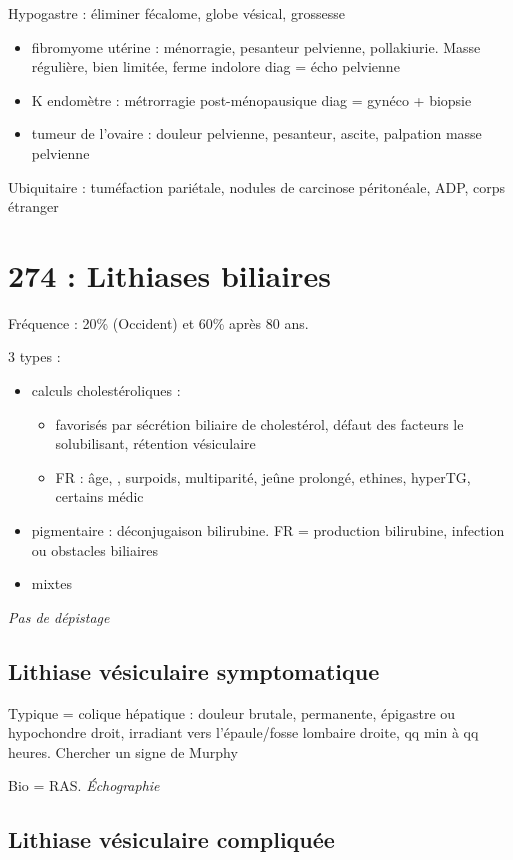 \documentclass[11pt]{article}
\begin{document}
Hypogastre : éliminer fécalome, globe vésical, grossesse
\begin{itemize}
\item fibromyome utérine : ménorragie, pesanteur pelvienne, pollakiurie. Masse
régulière, bien limitée, ferme indolore \thus diag = écho pelvienne
\item K endomètre : métrorragie post-ménopausique \thus diag = gynéco + biopsie
\item tumeur de l'ovaire : douleur pelvienne, pesanteur, ascite, palpation masse
pelvienne
\end{itemize}

Ubiquitaire : tuméfaction pariétale, nodules de carcinose péritonéale, ADP, corps étranger

\section{274 : Lithiases biliaires}
\label{sec:orgb6a93b9}
Fréquence : 20\% (Occident) et 60\% après 80 ans.

3 types :
\begin{itemize}
\item calculs cholestéroliques : 
\begin{itemize}
\item favorisés par \inc sécrétion biliaire de
cholestérol, défaut des facteurs le solubilisant, rétention vésiculaire
\item FR : âge, \female, surpoids, multiparité, jeûne prolongé, ethines, hyperTG,
certains médic
\end{itemize}
\item pigmentaire : déconjugaison bilirubine. FR = \inc production bilirubine,
infection ou obstacles biliaires
\item mixtes
\end{itemize}

\emph{Pas de dépistage}

\subsection{Lithiase vésiculaire symptomatique}
\label{sec:org6df10ef}
Typique = colique hépatique : douleur brutale, permanente, épigastre ou
hypochondre droit, irradiant vers l'épaule/fosse lombaire droite, qq min à qq
heures. Chercher un signe de Murphy

Bio = RAS. \emph{Échographie}

\subsection{Lithiase vésiculaire compliquée}
\label{sec:org0c4e857}
\end{document}
